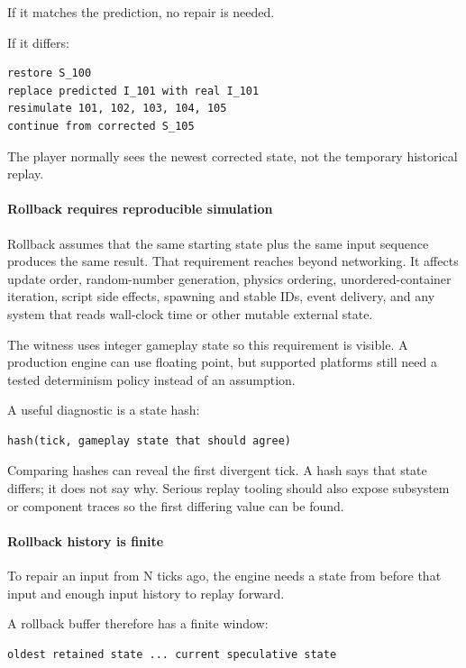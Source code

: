 If it matches the prediction, no repair is needed.

If it differs:

\begin{verbatim}
restore S_100
replace predicted I_101 with real I_101
resimulate 101, 102, 103, 104, 105
continue from corrected S_105
\end{verbatim}

The player normally sees the newest corrected state, not the temporary historical replay.

\paragraph{Rollback requires reproducible simulation}\label{rollback-requires-reproducible-simulation}

Rollback assumes that the same starting state plus the same input sequence produces the same result. That requirement reaches beyond networking. It affects update order, random-number generation, physics ordering, unordered-container iteration, script side effects, spawning and stable IDs, event delivery, and any system that reads wall-clock time or other mutable external state.

The witness uses integer gameplay state so this requirement is visible. A production engine can use floating point, but supported platforms still need a tested determinism policy instead of an assumption.

A useful diagnostic is a state hash:

\begin{verbatim}
hash(tick, gameplay state that should agree)
\end{verbatim}

Comparing hashes can reveal the first divergent tick. A hash says that state differs; it does not say why. Serious replay tooling should also expose subsystem or component traces so the first differing value can be found.

\paragraph{Rollback history is finite}\label{rollback-history-is-finite}

To repair an input from N ticks ago, the engine needs a state from before that input and enough input history to replay forward.

A rollback buffer therefore has a finite window:

\begin{verbatim}
oldest retained state ... current speculative state
\end{verbatim}

